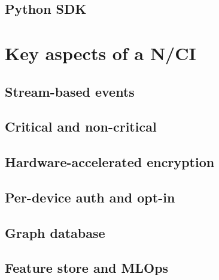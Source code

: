 \subsection{Python SDK}
\label{chapter4-python-sdk}

\section{Key aspects of a N/CI}
\label{chapter4-key-aspects}

\subsection{Stream-based events}
\label{chapter4-stream-based-events}

\subsection{Critical and non-critical}
\label{chapter4-critical-and-non-critical}

\subsection{Hardware-accelerated encryption}
\label{chapter4-hardware-accelerated-encryption}

\subsection{Per-device auth and opt-in}
\label{chapter4-user-side-opt-in}

\subsection{Graph database}
\label{chapter4-graph-database}

\subsection{Feature store and MLOps}
\label{chapter4-feature-store-and-mlops}


